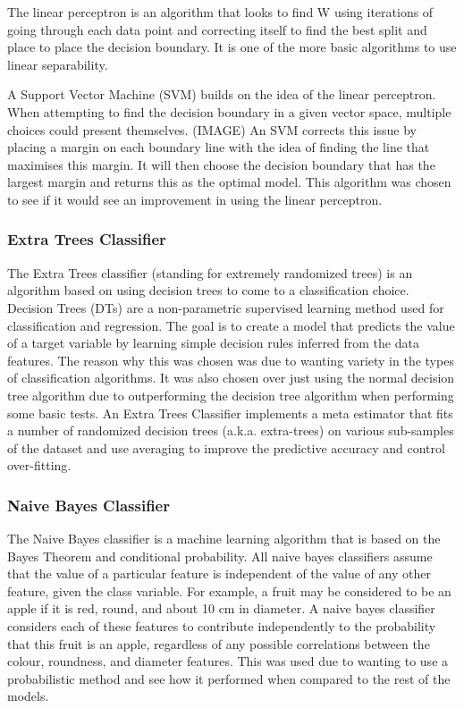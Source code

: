 \documentclass[a4paper,11pt]{report}
\begin{document}
The linear perceptron is an algorithm that looks to find W using iterations of going through each data point and correcting itself to find the best split and place to place the decision boundary. It is one of the more basic algorithms to use linear separability.

A Support Vector Machine (SVM) builds on the idea of the linear perceptron.  When attempting to find the decision boundary in a given vector space, multiple choices could present themselves. (IMAGE) An SVM corrects this issue by placing a margin on each boundary line with the idea of finding the line that maximises this margin. It will then choose the decision boundary that has the largest margin and returns this as the optimal model. This algorithm was chosen to see if it would see an improvement in using the linear perceptron.

\subsubsection{Extra Trees Classifier}
The Extra Trees classifier (standing for extremely randomized trees) is an algorithm based on using decision trees to come to a classification choice. Decision Trees (DTs) are a non-parametric supervised learning method used for classification and regression. The goal is to create a model that predicts the value of a target variable by learning simple decision rules inferred from the data features. The reason why this was chosen was due to wanting variety in the types of classification algorithms. It was also chosen over just using the normal decision tree algorithm due to outperforming the decision tree algorithm when performing some basic tests. An Extra Trees Classifier implements a meta estimator that fits a number of randomized decision trees (a.k.a. extra-trees) on various sub-samples of the dataset and use averaging to improve the predictive accuracy and control over-fitting.

\subsubsection{Naive Bayes Classifier}
The Naive Bayes classifier is a machine learning algorithm that is based on the Bayes Theorem and conditional probability. All naive bayes classifiers assume that the value of a particular feature is independent of the value of any other feature, given the class variable. For example, a fruit may be considered to be an apple if it is red, round, and about 10 cm in diameter. A naive bayes classifier considers each of these features to contribute independently to the probability that this fruit is an apple, regardless of any possible correlations between the colour, roundness, and diameter features. This was used due to wanting to use a probabilistic method and see how it performed when compared to the rest of the models.
\end{document}
